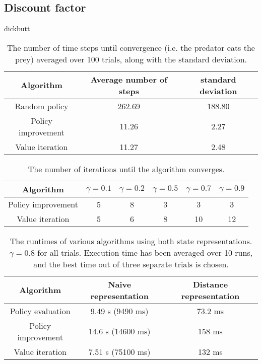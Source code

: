 \documentclass[a4paper, 12pt]{article}
\begin{document}
\subsection*{Discount factor}
dickbutt

\begin{table}[htb]
	\begin{tabular}{|c|c|c|}
		\hline
		Algorithm & Average number of steps & standard deviation \\
		\hline
		Random policy & 262.69 & 188.80 \\
		Policy improvement & 11.26 & 2.27 \\
		Value iteration & 11.27 & 2.48 \\
		\hline
	\end{tabular}
	\caption{The number of time steps until convergence (i.e. the predator eats
		the prey) averaged over 100 trials, along with the standard deviation.}
	\label{tbl:sim_convergence}
\end{table}

\begin{table}[htb]
	\begin{tabular}{|c|c|c|c|c|c|}
		\hline
		Algorithm & $\gamma = 0.1$ & $\gamma = 0.2$ & $\gamma = 0.5$ & $\gamma =
		0.7$ & $\gamma = 0.9$ \\
		\hline
		Policy improvement & 5 & 8 & 3 & 3 & 3 \\
		Value iteration & 5 & 6 & 8 & 10 & 12 \\
		\hline
	\end{tabular}
	\caption{The number of iterations until the algorithm converges.}
	\label{tbl:algo_convergence}
\end{table}

\begin{table}[htb]
	\begin{tabular}{|c|c|c|}
		\hline
		Algorithm & Naive representation & Distance representation \\
		\hline
		Policy evaluation & 9.49 s (9490 ms) & 73.2 ms \\
		Policy improvement & 14.6 s (14600 ms) & 158 ms \\
		Value iteration & 7.51 s (75100 ms)& 132 ms \\
		\hline
	\end{tabular}
	\caption{The runtimes of various algorithms using both state representations.
		$\gamma = 0.8$ for all trials. Execution time has been averaged over 10
		runs, and the best time out of three separate trials is chosen.}
	\label{tbl:performance}
\end{table}
\end{document}
